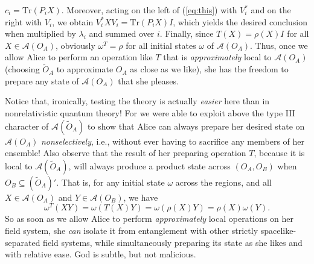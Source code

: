 \documentclass[12pt]{article}
\newcommand{\alg}[1]{\mbox{$\mathcal{#1}$}}
\begin{document}
                $c_{i}=\mbox{Tr}(P_{i}X)$.  Moreover, acting on the 
                left of (\ref{eq:this}) with $V_{i}^{*}$ and on the 
                right with $V_{i}$, we obtain 
                $V_{i}^{*}XV_{i}=\mbox{Tr}(P_{i}X)I$, 
                which yields the desired conclusion when multiplied 
                by $\lambda_{i}$ and summed over 
                $i$.   Finally, since $T(X)=\rho(X)I$ for all 
                $X\in\alg{A}(O_{A})$, obviously $\omega^{T}=\rho$ for all 
                initial states $\omega$ of $\alg{A}(O_{A})$.  Thus, once we 
                allow Alice to perform an operation like $T$ that is \emph{approximately} 
                local to $\alg{A}(O_{A})$ (choosing $\tilde{O}_{A}$ to 
                approximate $O_{A}$ as close as we like), she has the 
                freedom to 
                prepare any state of $\alg{A}(O_{A})$ that she pleases.  
                
                Notice that, ironically, testing the theory is actually  
                \emph{easier} here than in 
                nonrelativistic quantum theory!  For we were able to exploit 
                above the type
                III character of  $\alg{A}(\tilde{O}_{A})$ to show that Alice 
                can always prepare her desired state on $\alg{A}(O_{A})$ 
                \emph{nonselectively}, i.e., without ever 
                having to sacrifice any members of her ensemble!  
                Also observe that the result of her preparing 
                operation $T$, because it is local to 
                $\alg{A}(\tilde{O}_{A})$,   
                will always produce a product state across $(O_{A},O_{B})$ 
                when $O_{B}\subseteq (\tilde{O}_{A})'$.  That is, for any initial 
                state $\omega$ across the regions, and all 
                $X\in\alg{A}(O_{A})$ and $Y\in\alg{A}(O_{B})$, we have 
                \begin{equation}
                 \omega^{T}(XY)=\omega(T(X)Y)=\omega(\rho(X)Y)=\rho(X)\omega(Y).
                \end{equation}  
                So 
                as soon as we allow Alice to perform \emph{approximately} local 
                operations on her field system, she \emph{can} isolate it from 
                entanglement with other strictly spacelike-separated 
                field systems, while simultaneously preparing its state 
                as she likes and with 
                relative ease.
               God 
               is subtle, but not malicious.\vspace{.1in}
               
\end{document}

